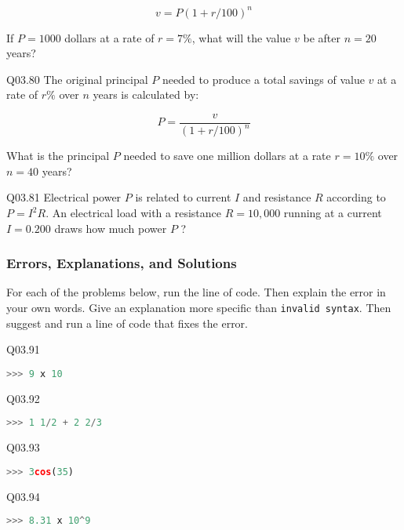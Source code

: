 \documentclass{book}
\newenvironment{problems}{}{}  %
\newcommand{\passthrough}[1]{#1}
\begin{document}
\begin{problems}
\[ v = P(1 + r/100)^n \]

If \(P=1000\) dollars at a rate of \(r=7\%\), what will the value \(v\)
be after \(n=20\) years?

Q03.80 The original principal \(P\) needed to produce a total savings of
value \(v\) at a rate of \(r\%\) over \(n\) years is calculated by:

\[ P = \frac{v}{(1+r/100)^n} \]

What is the principal \(P\) needed to save one million dollars at a rate
\(r=10\%\) over \(n=40\) years?

Q03.81 Electrical power \(P\) is related to current \(I\) and resistance
\(R\) according to \(P = I^2R\). An electrical load with a resistance
\(R = 10,000\) running at a current \(I=0.200\) draws how much power
\(P\) ?
        \end{problems}

    




    
        \hypertarget{errors-explanations-and-solutions}{%
\subsubsection{Errors, Explanations, and
Solutions}\label{errors-explanations-and-solutions}}

For each of the problems below, run the line of code. Then explain the
error in your own words. Give an explanation more specific than
\passthrough{\lstinline!invalid syntax!}. Then suggest and run a line of
code that fixes the error.

Q03.91

\begin{lstlisting}[language=Python]
>>> 9 x 10
\end{lstlisting}

Q03.92

\begin{lstlisting}[language=Python]
>>> 1 1/2 + 2 2/3
\end{lstlisting}

Q03.93

\begin{lstlisting}[language=Python]
>>> 3cos(35)
\end{lstlisting}

Q03.94

\begin{lstlisting}[language=Python]
>>> 8.31 x 10^9
\end{lstlisting}
\end{document}
